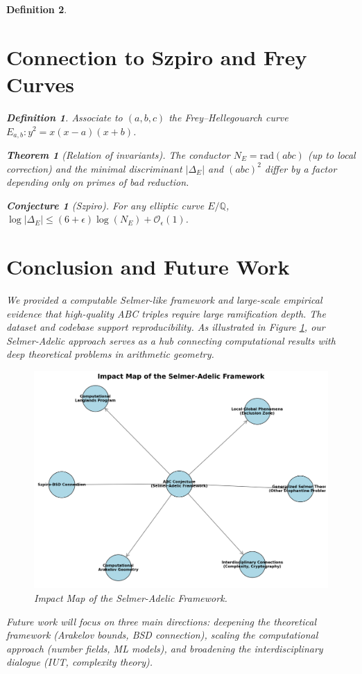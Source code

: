 \documentclass[11pt,a4paper]{article}
\newtheorem{definition}{Definition}[section]
\newtheorem{conjecture}{Conjecture}[section]
\newtheorem{theorem}{Theorem}[section]
\newcommand{\Q}{\mathbb{Q}}
\newcommand{\rad}{\mathrm{rad}}
\begin{document}
\begin{definition}
\section{Connection to Szpiro and Frey Curves}
\begin{definition}
Associate to $(a,b,c)$ the Frey--Hellegouarch curve $E_{a,b}: y^2 = x(x-a)(x+b)$.
\end{definition}
\begin{theorem}[Relation of invariants]
The conductor $N_E=\rad(abc)$ (up to local correction) and the minimal discriminant $|\Delta_E|$ and $(abc)^2$ differ by a factor depending only on primes of bad reduction.
\end{theorem}
\begin{conjecture}[Szpiro]
For any elliptic curve $E/\Q$, $\log|\Delta_E| \le (6+\epsilon)\log(N_E) + \mathcal{O}_\epsilon(1)$.
\end{conjecture}

\section{Conclusion and Future Work}
We provided a computable Selmer-like framework and large-scale empirical evidence that high-quality ABC triples require large ramification depth. The dataset and codebase support reproducibility. As illustrated in Figure \ref{fig:impact_map}, our Selmer-Adelic approach serves as a hub connecting computational results with deep theoretical problems in arithmetic geometry.
\begin{figure}[h!]
    \centering
    \includegraphics[width=\textwidth]{../figures/impact_map.png}
    \caption{Impact Map of the Selmer-Adelic Framework.}
    \label{fig:impact_map}
\end{figure}
Future work will focus on three main directions: deepening the theoretical framework (Arakelov bounds, BSD connection), scaling the computational approach (number fields, ML models), and broadening the interdisciplinary dialogue (IUT, complexity theory).


\end{definition}
\end{document}
